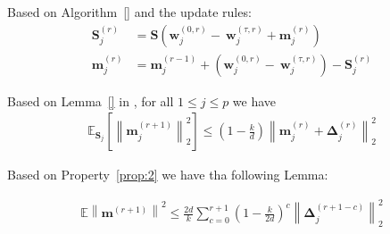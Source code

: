 Based on Algorithm~\ref{} and the update rules:
\begin{align}
\mathbf{S}_j^{(r)}&=\mathbf{S}\left(\boldsymbol{w}_j^{(0,r)}-~{\boldsymbol{w}}_{j}^{(\tau,r)}+\mathbf{m}_j^{(r)}\right)\nonumber\\
\mathbf{m}_j^{(r)}&=\mathbf{m}_j^{(r-1)}+\left(\boldsymbol{w}_j^{(0,r)}-~{\boldsymbol{w}}_{j}^{(\tau,r)}\right)-\mathbf{S}_j^{(r)}
\end{align}




\begin{property}\label{prop:2}
Based on Lemma~\ref{} in \cite{ivkin2019communication}, for all $1\leq j\leq p$ we have
\begin{align}
    \mathbb{E}_{\mathbf{S}_j}\left[\left\|\mathbf{m}_j^{(r+1)}\right\|^2_2\right]\leq\left(1-\frac{k}{d}\right)\left\|\mathbf{m}_j^{(r)}+\mathbf{\Delta}_j^{(r)}\right\|_2^2\label{eq:sketch_var}
\end{align}
\end{property}
Based on Property~\ref{prop:2} we have tha following Lemma:
\begin{lemma}\label{lmm:bndng-m}
\begin{align}
        \mathbb{E}\left\|\mathbf{m}^{(r+1)}\right\|^2\leq\frac{2d}{k}\sum_{c=0}^{r+1}\left(1-\frac{k}{2d}\right)^{c}\left\|\mathbf{\Delta}_j^{(r+1-c)}\right\|_2^2
\end{align}
\end{lemma}
